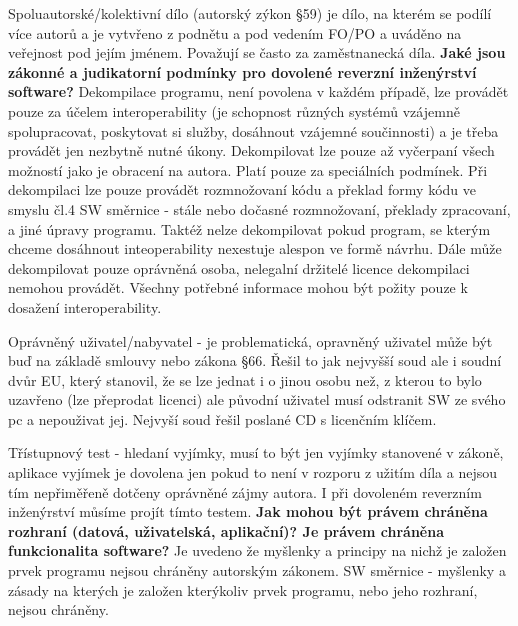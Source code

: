 \documentclass[12pt,a4paper,czech]{report}
\newcommand{\nadpis}[1]{\noindent\textbf{\Large{#1}}\normalsize}
\begin{document}
Spoluautorské/kolektivní dílo (autorský zýkon §59) je dílo, na kterém se podílí více autorů a je vytvřeno z podnětu a pod vedením FO/PO a uváděno na veřejnost pod jejím jménem. Považují se často za zaměstnanecká díla.
\newline
\newline
\nadpis{Jaké jsou zákonné a judikatorní podmínky pro dovolené reverzní inženýrství software?}
\newline
\newline
Dekompilace programu, není povolena v každém případě, lze provádět pouze za účelem interoperability (je schopnost různých systémů vzájemně spolupracovat, poskytovat si služby, dosáhnout vzájemné součinnosti) a je třeba provádět jen nezbytně nutné úkony. Dekompilovat lze pouze až vyčerpaní všech možností jako je obracení na autora. Platí pouze za speciálních podmínek. Při dekompilaci lze pouze provádět rozmnožovaní kódu a překlad formy kódu ve smyslu čl.4 SW směrnice - stále nebo dočasné rozmnožovaní, překlady zpracovaní, a jiné úpravy programu. Taktéž nelze dekompilovat pokud program, se kterým chceme dosáhnout inteoperability nexestuje alespon ve formě návrhu. Dále může dekompilovat pouze oprávněná osoba, nelegalní držitelé licence dekompilaci nemohou provádět. Všechny potřebné informace mohou být požity pouze k dosažení interoperability. 

Oprávněný uživatel/nabyvatel - je problematická, opravněný uživatel může být buď na základě smlouvy nebo zákona §66. Řešil to jak nejvyšší soud ale i soudní dvůr EU, který stanovil, že se lze jednat i o jinou osobu než, z kterou to bylo uzavřeno (lze přeprodat licenci) ale původní uživatel musí odstranit SW ze svého pc a nepouživat jej. Nejvyší soud řešil poslané CD s licenčním klíčem.

Třístupnový test - hledaní vyjímky, musí to být jen vyjímky stanovené v zákoně, aplikace vyjímek je dovolena jen pokud to není v rozporu z užitím díla a nejsou tím nepřiměřeně dotčeny oprávněné zájmy autora. I při dovoleném reverzním inženýrství můsíme projít tímto testem.
\newline
\newline
\nadpis{Jak mohou být právem chráněna rozhraní (datová, uživatelská, aplikační)? Je právem chráněna funkcionalita software?}
\newline
\newline
Je uvedeno že myšlenky a principy na nichž je založen prvek programu nejsou chráněny autorským zákonem. SW směrnice - myšlenky a zásady na kterých je založen kterýkoliv prvek programu, nebo jeho rozhraní, nejsou chráněny. 
\end{document}
